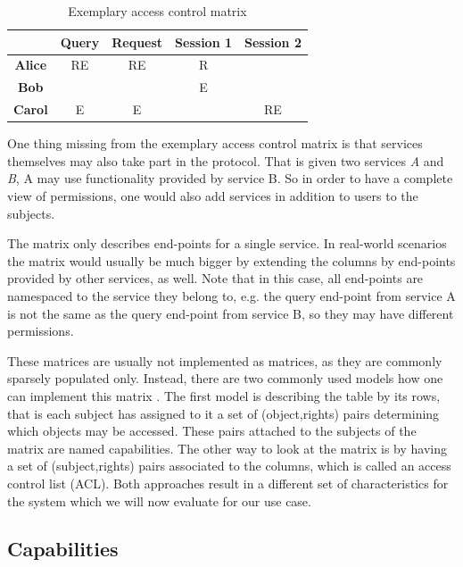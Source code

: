\begin{table}
    \centering
    \begin{tabular}{|c|c|c|c|c|}
        \hline
              & \bfseries Query & \bfseries Request & \bfseries Session 1 & \bfseries Session 2\\
        \hline
        \bfseries Alice & RE    & RE      & R         &\\
        \hline
        \bfseries Bob   &       &         & E         &\\
        \hline
        \bfseries Carol & E     & E       &           & RE\\
        \hline
    \end{tabular}

    \caption{Exemplary access control matrix}
    \label{tab:access-control-matrix}
\end{table}

One thing missing from the exemplary access control matrix is that services themselves may also take part in the protocol.
That is given two services \emph{A} and \emph{B}, A may use functionality provided by service B.
So in order to have a complete view of permissions, one would also add services in addition to users to the subjects.

The matrix only describes end-points for a single service.
In real-world scenarios the matrix would usually be much bigger by extending the columns by end-points provided by other services, as well.
Note that in this case, all end-points are namespaced to the service they belong to, e.g. the query end-point from service A is not the same as the query end-point from service B, so they may have different permissions.

These matrices are usually not implemented as matrices, as they are commonly sparsely populated only.
Instead, there are two commonly used models how one can implement this matrix \cite{tanenbaum2014modern}.
The first model is describing the table by its rows, that is each subject has assigned to it a set of (object,rights) pairs determining which objects may be accessed.
These pairs attached to the subjects of the matrix are named capabilities.
The other way to look at the matrix is by having a set of (subject,rights) pairs associated to the columns, which is called an access control list (ACL).
Both approaches result in a different set of characteristics for the system which we will now evaluate for our use case.

\subsection{Capabilities}

